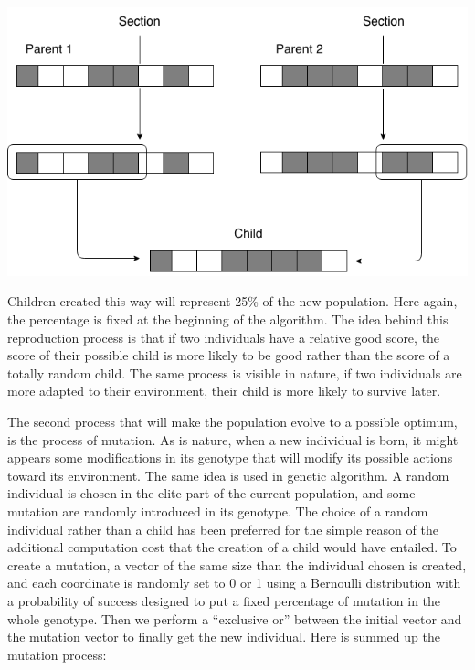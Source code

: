 \documentclass{report}
\begin{document}
		\vspace{1cm}
		\begin{center}
			\includegraphics[scale=0.45]{ressources/ag1}
		\end{center}

		\vspace{1cm}
		Children created this way will represent 25\% of the new population. Here again, the percentage is fixed at the beginning of the algorithm. The idea behind this reproduction process is that if two individuals have a relative good score, the score of their possible child is more likely to be good rather than the score of a totally random child. The same process is visible in nature, if two individuals are more adapted to their environment, their child is more likely to survive later.
		
		The second process that will make the population evolve to a possible optimum, is the process of mutation. As is nature, when a new individual is born, it might appears some modifications in its genotype that will modify its possible actions toward its environment. The same idea is used in genetic algorithm. A random individual is chosen in the elite part of the current population, and some mutation are randomly introduced in its genotype. The choice of a random individual rather than a child has been preferred for the simple reason of the additional computation cost that the creation of a child would have entailed. To create a mutation, a vector of the same size than the individual chosen is created, and each coordinate is randomly set to 0 or 1 using a Bernoulli distribution with a probability of success designed to put a fixed percentage of mutation in the whole genotype. Then we perform a “exclusive or” between the initial vector and the mutation vector to finally get the new individual. Here is summed up the mutation process:
		
\end{document}
